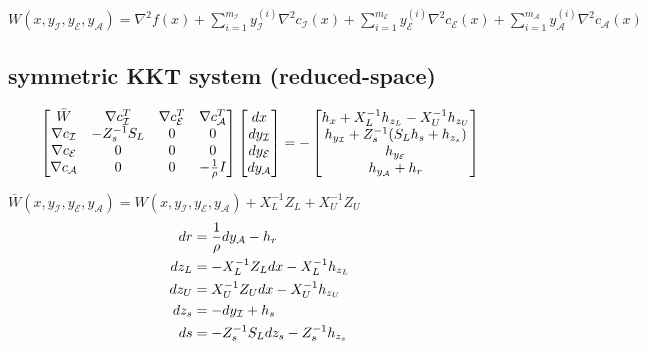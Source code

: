 \documentclass[10pt]{article}
\begin{document}
	$ W(x,y_{\mathcal I},y_{\mathcal E},y_{\mathcal A}) = \nabla^2 f(x) + \sum_{i = 1}^{m_{\mathcal I}} y_{\mathcal I}^{(i)} \nabla^2 c_{\mathcal I}(x) + \sum_{i = 1}^{m_{\mathcal E}} y_{\mathcal E}^{(i)} \nabla^2 c_{\mathcal E}(x) + \sum_{i = 1}^{m_{\mathcal A}} y_{\mathcal A}^{(i)} \nabla^2 c_{\mathcal A}(x)$
	
	\subsection*{symmetric KKT system (reduced-space)}
	\begin{equation}
	\begin{aligned}
		\begin{bmatrix}
		\bar{W} & \nabla c_{\mathcal I}^T & \nabla c_{\mathcal E}^T & \nabla c_{\mathcal A}^T \\
		\nabla c_{\mathcal I} & -Z_s^{-1}S_L & 0 & 0 \\
		\nabla c_{\mathcal E} & 0 & 0 & 0 \\
		\nabla c_{\mathcal A} & 0 & 0 &-\frac{1}{\rho}I \\
		\end{bmatrix}
		\begin{bmatrix}
		dx \\
		dy_{\mathcal I} \\
		dy_{\mathcal E} \\
		dy_{\mathcal A} \\
		\end{bmatrix}
		=
		-\begin{bmatrix}
		h_x + X_L^{-1}h_{z_L} - X_U^{-1} h_{z_U}\\
		h_{y_{\mathcal I}} + Z_s^{-1}(S_L h_s + h_{z_s})\\
		h_{y_{\mathcal E}} \\
		h_{y_{\mathcal A}} + h_r\\
		\end{bmatrix}
	\end{aligned} \notag
	\end{equation}
	
	$\bar{W}(x,y_{\mathcal I},y_{\mathcal E},y_{\mathcal A}) = W(x,y_{\mathcal I},y_{\mathcal E},y_{\mathcal A}) + X_L^{-1}Z_L + X_U^{-1}Z_U $
	\\
	\begin{equation}
	\begin{aligned}
		dr &= \frac{1}{\rho} dy_{\mathcal A} - h_r\\
		dz_L &= -X_L^{-1}Z_L dx - X_L^{-1} h_{z_L}\\
		dz_U &= X_U^{-1}Z_U dx - X_U^{-1} h_{z_U}\\
		dz_s &= -dy_{\mathcal I} + h_s\\
		ds &= -Z_s^{-1}S_L dz_s - Z_s^{-1} h_{z_s}\\ \notag
	\end{aligned}
	\end{equation}
	
\end{document}
